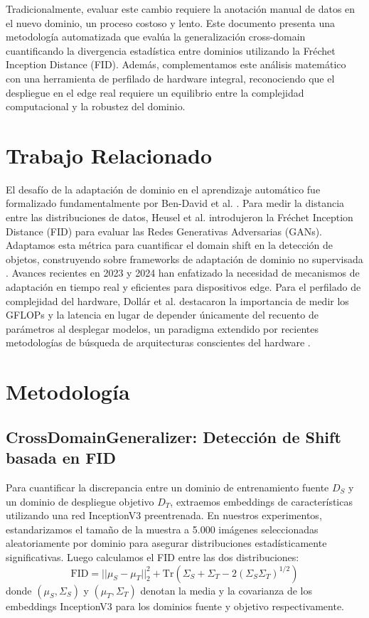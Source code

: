 \documentclass[conference]{IEEEtran}
\begin{document}
Tradicionalmente, evaluar este cambio requiere la anotación manual de datos en el nuevo dominio, un proceso costoso y lento. Este documento presenta una metodología automatizada que evalúa la generalización cross-domain cuantificando la divergencia estadística entre dominios utilizando la Fréchet Inception Distance (FID). Además, complementamos este análisis matemático con una herramienta de perfilado de hardware integral, reconociendo que el despliegue en el edge real requiere un equilibrio entre la complejidad computacional y la robustez del dominio.

\section{Trabajo Relacionado}
El desafío de la adaptación de dominio en el aprendizaje automático fue formalizado fundamentalmente por Ben-David et al. \cite{ben2010theory}. Para medir la distancia entre las distribuciones de datos, Heusel et al. \cite{heusel2017gans} introdujeron la Fréchet Inception Distance (FID) para evaluar las Redes Generativas Adversarias (GANs). Adaptamos esta métrica para cuantificar el domain shift en la detección de objetos, construyendo sobre frameworks de adaptación de dominio no supervisada \cite{tzeng2017adversarial, saito2019strong}. Avances recientes en 2023 y 2024 \cite{wang2023domain, zhang2024robust} han enfatizado la necesidad de mecanismos de adaptación en tiempo real y eficientes para dispositivos edge. Para el perfilado de complejidad del hardware, Dollár et al. \cite{dollar2021fast} destacaron la importancia de medir los GFLOPs y la latencia en lugar de depender únicamente del recuento de parámetros al desplegar modelos, un paradigma extendido por recientes metodologías de búsqueda de arquitecturas conscientes del hardware \cite{chen2023hardware}.

\section{Metodología}

\subsection{CrossDomainGeneralizer: Detección de Shift basada en FID}
Para cuantificar la discrepancia entre un dominio de entrenamiento fuente $D_S$ y un dominio de despliegue objetivo $D_T$, extraemos embeddings de características utilizando una red InceptionV3 preentrenada. En nuestros experimentos, estandarizamos el tamaño de la muestra a 5.000 imágenes seleccionadas aleatoriamente por dominio para asegurar distribuciones estadísticamente significativas. Luego calculamos el FID entre las dos distribuciones:
\begin{equation}
\text{FID} = ||\mu_S - \mu_T||_2^2 + \text{Tr}(\Sigma_S + \Sigma_T - 2(\Sigma_S \Sigma_T)^{1/2})
\end{equation}
donde $(\mu_S, \Sigma_S)$ y $(\mu_T, \Sigma_T)$ denotan la media y la covarianza de los embeddings InceptionV3 para los dominios fuente y objetivo respectivamente.
\end{document}
